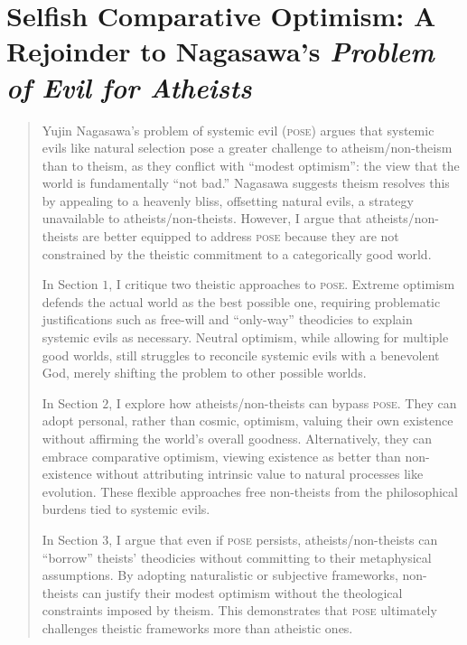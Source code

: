 
\chapter{Selfish Comparative Optimism: A Rejoinder to Nagasawa's \emph{Problem of Evil for Atheists}}


\renewcommand*{\thesection}{Section~\arabic{section}:} 
\renewcommand*{\thesubsection}{\arabic{section}.\arabic{subsection}}


\begin{quote}
Yujin Nagasawa's problem of systemic evil (\textsc{pose}) argues that systemic
evils like natural selection pose a greater challenge to
atheism/non-theism than to theism, as they conflict with ``modest
optimism'': the view that the world is fundamentally ``not bad.''
Nagasawa suggests theism resolves this by appealing to a heavenly bliss,
offsetting natural evils, a strategy unavailable to
atheists/non-theists. However, I argue that atheists/non-theists are
better equipped to address \textsc{pose} because they are not constrained by the
theistic commitment to a categorically good world.

In Section $1$, I critique two theistic approaches to \textsc{pose}. Extreme
optimism defends the actual world as the best possible one, requiring
problematic justifications such as free-will and ``only-way'' theodicies
to explain systemic evils as necessary. Neutral optimism, while allowing
for multiple good worlds, still struggles to reconcile systemic evils
with a benevolent God, merely shifting the problem to other possible
worlds.

In Section $2$, I explore how atheists/non-theists can bypass \textsc{pose}. They
can adopt personal, rather than cosmic, optimism, valuing their own
existence without affirming the world's overall goodness. Alternatively,
they can embrace comparative optimism, viewing existence as better than
non-existence without attributing intrinsic value to natural processes
like evolution. These flexible approaches free non-theists from the
philosophical burdens tied to systemic evils.

In Section $3$, I argue that even if \textsc{pose} persists, atheists/non-theists
can ``borrow'' theists' theodicies without committing to their
metaphysical assumptions. By adopting naturalistic or subjective
frameworks, non-theists can justify their modest optimism without the
theological constraints imposed by theism. This demonstrates that \textsc{pose}
ultimately challenges theistic frameworks more than atheistic ones.
\end{quote}

